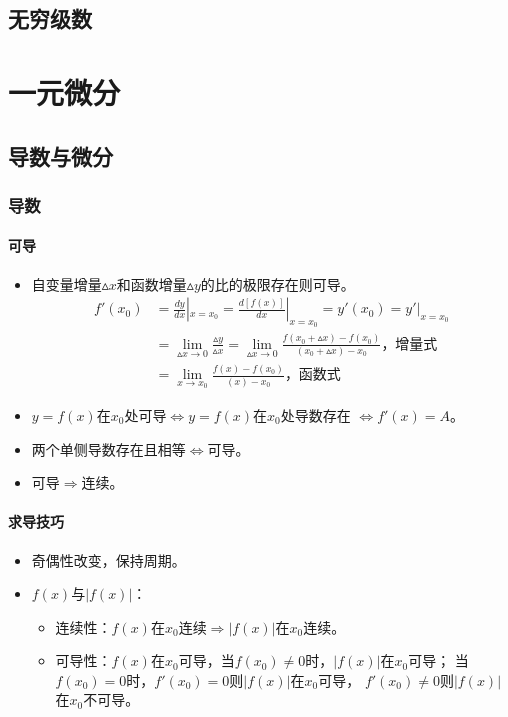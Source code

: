 \documentclass[
12pt, %
a4paper, 
oneside, %
headinclude,footinclude, %
]{scrartcl}
\begin{document}
\subsection{无穷级数}
\section{一元微分}
\subsection{导数与微分}
\subsubsection{导数}
\paragraph{可导}
\begin{itemize}
\item 自变量增量$ \vartriangle x $和函数增量$ \vartriangle y $的比的极限存在则可导。
\begin{align*}
f'(x_0) &= \frac{dy}{dx}|_{x = x_0} = \frac{d[f(x)]}{dx}|_{x = x_0} = y'(x_0) = y'|_{x = x_0} \\
&= \lim_{\vartriangle x \to 0}\frac{\vartriangle y}{\vartriangle x} 
= \lim_{\vartriangle x \to 0}\frac{f(x_0 + \vartriangle x) - f(x_0)}{(x_0 + \vartriangle x) - x_0} \text{，增量式} \\
&= \lim_{x \to x_0}\frac{f(x) - f(x_0)}{(x) - x_0} \text{，函数式}
\end{align*}
\item $ y = f(x) $在$ x_0 $处可导$ \Leftrightarrow $$ y = f(x) $在$ x_0 $处导数存在
$ \Leftrightarrow $$ f'(x) = A $。
\item 两个单侧导数存在且相等$ \Leftrightarrow $可导。
\item 可导$ \Rightarrow $连续。
\end{itemize}
\paragraph{求导技巧}
\begin{itemize}
\item 奇偶性改变，保持周期。
\item $ f(x) $与$ |f(x)| $：
\begin{itemize}
\item 连续性：$ f(x) $在$ x_0 $连续$ \Rightarrow $$ |f(x)| $在$ x_0 $连续。
\item 可导性：$ f(x) $在$ x_0 $可导，当$ f(x_0) \neq 0 $时，$ |f(x)| $在$ x_0 $可导；
当$ f(x_0) = 0 $时，$ f'(x_0) = 0 $则$ |f(x)| $在$ x_0 $可导，
$ f'(x_0) \neq 0 $则$ |f(x)| $在$ x_0 $不可导。
\end{itemize}
\end{itemize}
\end{document}
